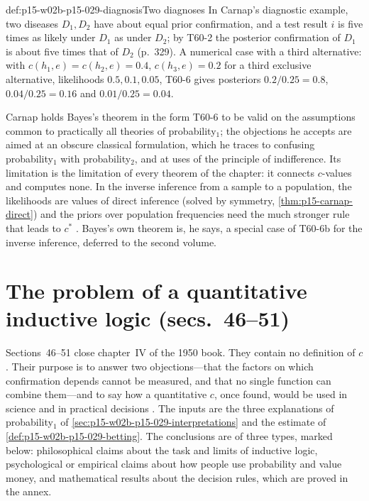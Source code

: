 \begin{hbexample}{def:p15-w02b-p15-029-diagnosis}{Two diagnoses}
In Carnap's diagnostic example, two diseases \(D_1,D_2\) have about
equal prior confirmation, and a test result \(i\) is five times as
likely under \(D_1\) as under \(D_2\); by T60-2 the posterior
confirmation of \(D_1\) is about five times that of \(D_2\) (p.~329).
A numerical case with a third alternative: with \(c(h_1,e)=c(h_2,e)=0.4\), \(c(h_3,e)=0.2\) for a third
exclusive alternative, likelihoods \(0.5,0.1,0.05\), T60-6 gives
posteriors \(0.2/0.25=0.8\), \(0.04/0.25=0.16\) and \(0.01/0.25=0.04\).
\end{hbexample}

Carnap holds Bayes's theorem in the form T60-6 to be valid on the
assumptions common to practically all theories of probability\(_1\);
the objections he accepts are aimed at an obscure classical
formulation, which he traces to confusing probability\(_1\) with
probability\(_2\), and at uses of the principle of indifference. Its
limitation is the limitation of every theorem of the chapter: it
connects \(c\)-values and computes none. In the inverse inference from
a sample to a population, the likelihoods are values of direct inference
(solved by symmetry, \cref{thm:p15-carnap-direct}) and the priors over
population frequencies need the much stronger rule that leads to \(c^*\)
\cite[sec.~60, pp.~331--333]{Carnap1950Probability}. Bayes's own
theorem is, he says, a special case of T60-6b for the inverse inference,
deferred to the second volume.

\section{The problem of a quantitative inductive logic (secs.~46--51)}
\label{sec:p15-w02b-p15-029-problem}

Sections~46--51 close chapter~IV of the 1950 book. They contain no
definition of \(c\). Their purpose is to answer two objections---that
the factors on which confirmation depends cannot be measured, and that
no single function can combine them---and to say how a quantitative
\(c\), once found, would be used in science and in practical decisions
\cite[secs.~46--51, pp.~219--279]{Carnap1950Probability}. The inputs
are the three explanations of probability\(_1\) of
\cref{sec:p15-w02b-p15-029-interpretations} and the estimate of
\cref{def:p15-w02b-p15-029-betting}. The conclusions are of three
types, marked below: philosophical claims about the task and limits of
inductive logic, psychological or empirical claims about how people use
probability and value money, and mathematical results about the
decision rules, which are proved in the annex.

